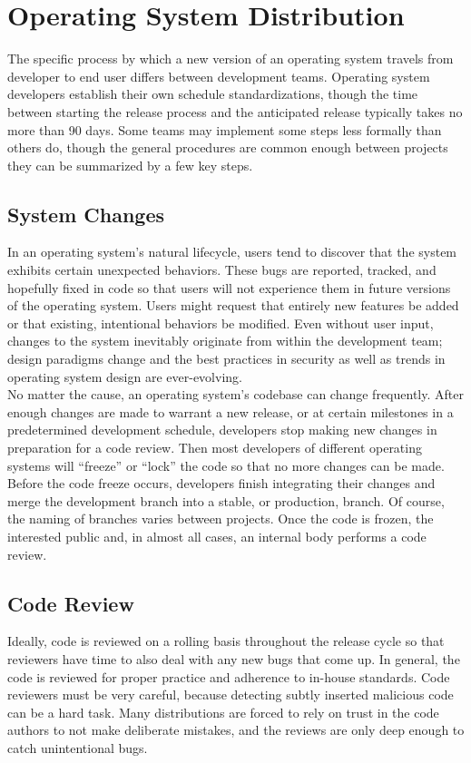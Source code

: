 \documentclass[conference]{IEEEtran}
\begin{document}
\section{Operating System Distribution}

The specific process by which a new version of an operating system
travels from developer to end user differs between development teams.
Operating system developers establish their own schedule
standardizations, though the time between starting the release process
and the anticipated release typically takes no more than 90 days.
Some teams may implement some steps less formally than others do,
though the general procedures are common enough between projects they can be
summarized by a few key steps.

\subsection{System Changes}

In an operating system's natural lifecycle, users tend to discover that
the system exhibits certain unexpected behaviors.
These bugs are reported, tracked, and hopefully fixed in code so that
users will not experience them in future versions of the operating system.
Users might request that entirely new features be added
or that existing, intentional behaviors be modified.
Even without user input, changes to the system inevitably
originate from within the development team; design paradigms change
and the best practices in security as well as trends in operating system design
are ever-evolving.\\
\indent No matter the cause, an operating system's codebase can change
frequently. After enough changes are made to warrant a new release,
or at certain milestones in a predetermined development schedule,
developers stop making new changes in preparation for a code review.
Then most developers of different operating systems will ``freeze''
or ``lock'' the code so that no more changes can be made.
Before the code freeze occurs, developers finish integrating their changes
and merge the development branch into a stable, or production, branch.
Of course, the naming of branches varies between projects.
Once the code is frozen, the interested public and, in almost all cases,
an internal body performs a code review.

\subsection{Code Review}
Ideally, code is reviewed on a rolling basis
throughout the release cycle so that reviewers have time to also deal with any new bugs
that come up. 
In general, the code is reviewed for proper practice and adherence to in-house standards.
Code reviewers must be very careful, because detecting subtly inserted malicious
code can be a hard task. Many distributions are forced to rely on trust in the
code authors to not make deliberate mistakes, and the reviews are only deep
enough to catch unintentional bugs.
\end{document}
